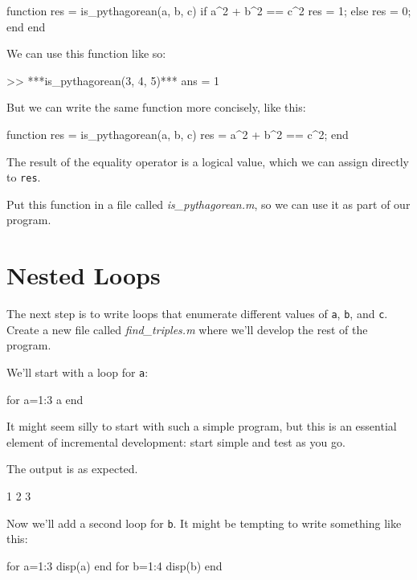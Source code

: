 \begin{code}
function res = is_pythagorean(a, b, c)
    if a^2 + b^2 == c^2
        res = 1;
    else
        res = 0;
    end
end
\end{code}
\newpage
We can use this function like so:


\begin{code}
>> ***is_pythagorean(3, 4, 5)***
ans = 1
\end{code}

But we can write the same function more concisely, like this:

\begin{code}
function res = is_pythagorean(a, b, c)
    res = a^2 + b^2 == c^2;
end
\end{code}

The result of the equality operator is a logical value, which we can assign directly 
to \lstinline{res}.

Put this function in a file called \emph{is\_pythagorean.m}, so we can use it as part of our program.


\section{Nested Loops}

The next step is to write loops that enumerate different values of \lstinline{a}, \lstinline{b}, and 
\lstinline{c}.  Create a new file called \emph{find\_triples.m} where we'll develop the rest of the program.


We'll start with a loop for \lstinline{a}:

\begin{code}
for a=1:3
    a
end
\end{code}

It might seem silly to start with such a simple program, but this is an essential element of incremental development: start simple and test as you go.

The output is as expected.

\begin{code}
1
2
3
\end{code}

Now we'll add a second loop for \lstinline{b}.  It might be tempting to write something like this:

\begin{code}
for a=1:3
    disp(a)
end
for b=1:4
    disp(b)
end
\end{code}

